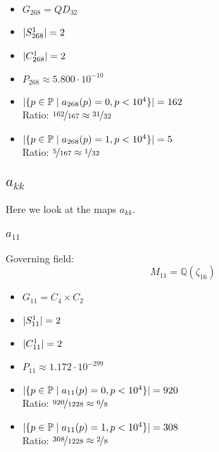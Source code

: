 \begin{multicols}{2}
	\begin{itemize}
		\item $G_{268} = QD_{32}$
		\item $| S_{268}^1 | = 2$
		\item $| C_{268}^1 | = 2$
		\item $P_{268} \approx 5.800 \cdot 10^{-10}$
	\end{itemize}
	\begin{itemize}
		\item $| \{ p \in \mathbb{P} \mid a_{268}(p)=0, p<10^4 \} | = 162$\\
		Ratio: $\nicefrac{ 162 }{ 167 } \approx \nicefrac{ 31 }{ 32 }$
		\item $| \{ p \in \mathbb{P} \mid a_{268}(p)=1, p<10^4 \} | = 5$\\
		Ratio: $\nicefrac{ 5 }{ 167 } \approx \nicefrac{ 1 }{ 32 }$
	\end{itemize}
\end{multicols}



\subsection{$a_{kk}$}
Here we look at the maps $a_{kk}$.

\subsubsection{$a_{11}$}
Governing field:
$$M_{11} = \mathbb{Q}\left(\zeta_{16}\right)$$
\begin{multicols}{2}
	\begin{itemize}
		\item $G_{11} = C_4 \times C_2$
		\item $| S_{11}^1 | = 2$
		\item $| C_{11}^1 | = 2$
		\item $P_{11} \approx 1.172 \cdot 10^{-299}$
	\end{itemize}
	\begin{itemize}
		\item $| \{ p \in \mathbb{P} \mid a_{11}(p)=0, p<10^4 \} | = 920$\\
		Ratio: $\nicefrac{ 920 }{ 1228 } \approx \nicefrac{ 6 }{ 8 }$
		\item $| \{ p \in \mathbb{P} \mid a_{11}(p)=1, p<10^4 \} | = 308$\\
		Ratio: $\nicefrac{ 308 }{ 1228 } \approx \nicefrac{ 2 }{ 8 }$
	\end{itemize}
\end{multicols}



